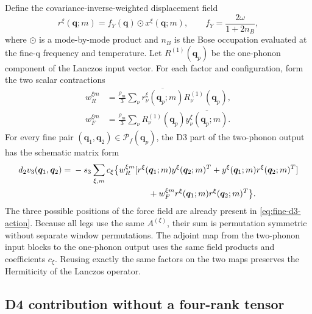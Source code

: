 \documentclass{article}
\begin{document}
Define the covariance-inverse-weighted displacement field
\begin{equation}
    r^\xi(\bm q;m)
    =
    f_Y(\bm q)\odot x^\xi(\bm q;m),
    \qquad
    f_Y=\frac{2\omega}{1+2n_B},
    \label{eq:fine-r-field}
\end{equation}
where $\odot$ is a mode-by-mode product and $n_B$ is the Bose
occupation evaluated at the fine-q frequency and temperature. Let
$R^{(1)}(\bm q_p)$ be the
one-phonon component of the Lanczos input vector. For each factor and
configuration, form the two scalar contractions
\begin{align}
    w_R^{\xi m}
    &=
    \frac{\rho_m}{3}
    \sum_\nu
    \overline{r_\nu^\xi(\bm q_p;m)}
    R_\nu^{(1)}(\bm q_p),
    \label{eq:d3-weight-r}\\
    w_F^{\xi m}
    &=
    \frac{\rho_m}{3}
    \sum_\nu
    R_\nu^{(1)}(\bm q_p)
    \overline{y_\nu^\xi(\bm q_p;m)}.
    \label{eq:d3-weight-f}
\end{align}
For every fine pair $(\bm q_1,\bm q_2)\in\mathcal P_f(\bm q_p)$, the D3
part of the two-phonon output has the schematic matrix form
\begin{align}
    d_2v_3(\bm q_1,\bm q_2)
    ={}&-s_3
    \sum_{\xi,m}c_\xi
    \bigl\{
    w_R^{\xi m}
    [r^\xi(\bm q_1;m)y^\xi(\bm q_2;m)^T
    +y^\xi(\bm q_1;m)r^\xi(\bm q_2;m)^T]
    \nonumber\\
    &\hspace{31mm}
    +w_F^{\xi m}
    r^\xi(\bm q_1;m)r^\xi(\bm q_2;m)^T
    \bigr\}.
    \label{eq:fine-d3-action}
\end{align}
The three possible positions of the force field are already present in
\autoref{eq:fine-d3-action}. Because all legs use the same $A^{(\xi)}$,
their sum is permutation symmetric without separate window permutations.
The adjoint map from the two-phonon input blocks to the one-phonon output
uses the same field products and coefficients $c_\xi$. Reusing exactly the
same factors on the two maps preserves the Hermiticity of the Lanczos
operator.

\subsection{D4 contribution without a four-rank tensor}
\label{sec:fine-d4-action}
\end{document}
